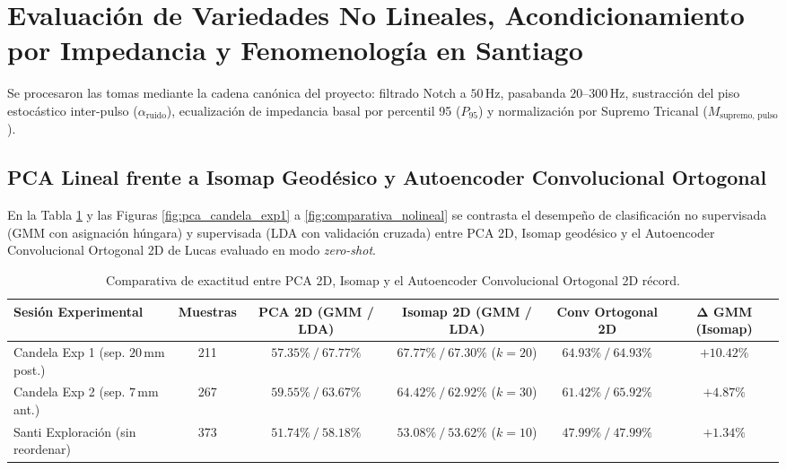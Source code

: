 \documentclass[11pt,a4paper]{article}
\begin{document}
\section{Evaluación de Variedades No Lineales, Acondicionamiento por Impedancia y Fenomenología en Santiago}

Se procesaron las tomas mediante la cadena canónica del proyecto: filtrado Notch a $50\,\text{Hz}$, pasabanda $20\text{--}300\,\text{Hz}$, sustracción del piso estocástico inter-pulso ($\alpha_{\text{ruido}}$), ecualización de impedancia basal por percentil 95 ($P_{95}$) y normalización por Supremo Tricanal ($M_{\text{supremo, pulso}}$).

\subsection{PCA Lineal frente a Isomap Geodésico y Autoencoder Convolucional Ortogonal}
En la Tabla \ref{tab:comparativa_nolineal} y las Figuras \ref{fig:pca_candela_exp1} a \ref{fig:comparativa_nolineal} se contrasta el desempeño de clasificación no supervisada (GMM con asignación húngara) y supervisada (LDA con validación cruzada) entre PCA 2D, Isomap geodésico y el Autoencoder Convolucional Ortogonal 2D de Lucas evaluado en modo \textit{zero-shot}.

\begin{table}[H]
\centering
\footnotesize
\begin{tabularx}{\textwidth}{l c c c c c}
\toprule
\textbf{Sesión Experimental} & \textbf{Muestras} & \textbf{PCA 2D (GMM / LDA)} & \textbf{Isomap 2D (GMM / LDA)} & \textbf{Conv Ortogonal 2D} & $\mathbf{\Delta}$ \textbf{GMM (Isomap)} \\
\midrule
Candela Exp 1 (sep. $20\,\text{mm}$ post.) & 211 & $57.35\% \ / \ 67.77\%$ & $\mathbf{67.77\%} \ / \ 67.30\%$ ($k=20$) & $64.93\% \ / \ 64.93\%$ & $\mathbf{+10.42\%}$ \\
Candela Exp 2 (sep. $7\,\text{mm}$ ant.)   & 267 & $59.55\% \ / \ 63.67\%$ & $\mathbf{64.42\%} \ / \ 62.92\%$ ($k=30$) & $61.42\% \ / \ 65.92\%$ & $\mathbf{+4.87\%}$ \\
Santi Exploración (sin reordenar)          & 373 & $51.74\% \ / \ 58.18\%$ & $53.08\% \ / \ 53.62\%$ ($k=10$) & $47.99\% \ / \ 47.99\%$ & $+1.34\%$ \\
\bottomrule
\end{tabularx}
\caption{Comparativa de exactitud entre PCA 2D, Isomap y el Autoencoder Convolucional Ortogonal 2D récord.}
\label{tab:comparativa_nolineal}
\end{table}
\end{document}

